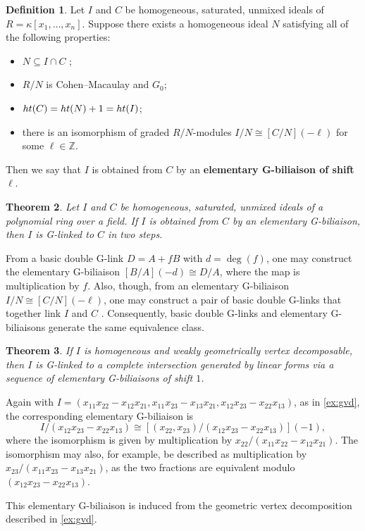 \documentclass[12pt, reqno]{amsart}
\numberwithin{equation}{section}
\newtheorem{theorem}{Theorem}[section]
\newtheorem{Main Conjecture}[theorem]{Main Conjecture}
\theoremstyle{definition}
\newtheorem{defn}[theorem]{Definition}
\newenvironment{example}
  {\pushQED{\qed}\renewcommand{\qedsymbol}{$\diamondsuit$}\examplex}
  {\popQED\endexamplex}
\theoremstyle{plain}
\newcommand{\hgt}{{\rm{ht }}}
\newcommand{\ZZ}{\mathbb{Z}}
\begin{document}
 \begin{defn}\label{def:Gbiliaison}
Let $I$ and $C$ be homogeneous, saturated, unmixed ideals of $R = \kappa[x_1, \ldots, x_n]$.  Suppose there exists a homogeneous ideal $N$ satisfying all of the following properties:
\begin{itemize}
    \item $N \subseteq I \cap C$ ;
    \item $R/N$ is Cohen--Macaulay and $G_0$;
    \item $\hgt(C) = \hgt(N)+1=\hgt(I)$;
    \item there is an isomorphism of graded $R/N$-modules $I/N \cong [C/N](-\ell)$ for some $\ell\in \ZZ$.
\end{itemize}
Then we say that $I$ is obtained from $C$ by an \textbf{elementary G-biliaison of shift $\ell$}.  
\end{defn}


\begin{theorem}\cite[Theorem 3.5]{Har07}
Let $I$ and $C$ be homogeneous, saturated, unmixed ideals of a polynomial ring over a field.  If $I$ is obtained from $C$ by an elementary G-biliaison, then $I$ is G-linked to $C$ in two steps.
\end{theorem}

From a basic double G-link $D = A+fB$ with $d = \deg(f)$, one may construct the elementary G-biliaison $[B/A](-d) \cong D/A$, where the map is multiplication by $f$.  Also, though, from an elementary G-biliaison $I/N \cong [C/N](-\ell)$, one may construct a pair of basic double G-links that together link $I$ and $C$ \cite[Remark 1.13(3)]{GMN13}.  Consequently, basic double G-links and elementary G-biliaisons generate the same equivalence class.

\begin{theorem}\cite[Theorem 4.4]{KR21}
    If $I$ is homogeneous and weakly geometrically vertex decomposable, then $I$ is G-linked to a complete intersection generated by linear forms via a sequence of elementary G-biliaisons of shift $1$.   
\end{theorem} 

\begin{example}
    Again with $I = (x_{11}x_{22}-x_{12}x_{21}, x_{11}x_{23}-x_{13}x_{21}, x_{12}x_{23}-x_{22}x_{13})$, as in \cref{ex:gvd}, the corresponding elementary G-biliaison is \[
    I/(x_{12}x_{23}-x_{22}x_{13}) \cong [(x_{22},x_{23})/(x_{12}x_{23}-x_{22}x_{13})](-1),
    \] where the isomorphism is given by multiplication by $x_{22}/(x_{11}x_{22}-x_{12}x_{21})$.  The isomorphism may also, for example, be described as multiplication by $x_{23}/(x_{11}x_{23}-x_{13}x_{21})$, as the two fractions are equivalent modulo $(x_{12}x_{23}-x_{22}x_{13})$.

    This elementary G-biliaison is induced from the geometric vertex decomposition described in \cref{ex:gvd}.
\end{example}
\end{document}

